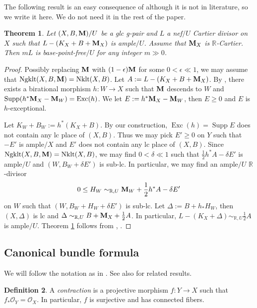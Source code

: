 \documentclass[11pt]{amsart}
\numberwithin{equation}{section}
\newcommand{\Mm}{{\bf{M}}}
\newcommand{\Rr}{\mathbb{R}}
\newcommand{\Exc}{\operatorname{Exc}}
\newcommand{\Nklt}{\operatorname{Nklt}}
\newcommand{\Supp}{\operatorname{Supp}}
\newcommand{\Ngklt}{\operatorname{Ngklt}}
\newtheorem{thm}{Theorem}[section]
\theoremstyle{definition}
\newtheorem{defn}[thm]{Definition}
\theoremstyle{definition}
\theoremstyle{definition}
\begin{document}
The following result is an easy consequence of \cite[Lemma
5.18]{HL21a} although it is not in literature, so we write it here.
We do not need it in the rest of the paper.

\begin{thm}\label{thm: bpf with mx r cartier}
  Let $(X,B,\Mm)/U$ be a glc g-pair and $L$ a nef$/U$ Cartier divisor
  on $X$ such that $L-(K_X+B+\Mm_X)$ is ample$/U$. Assume that
  $\Mm_X$ is $\mathbb R$-Cartier. Then $mL$ is base-point-free$/U$
  for any integer $m\gg 0$.
\end{thm}
\begin{proof}
  Possibly replacing $\Mm$ with $(1-\epsilon)\Mm$ for some
  $0<\epsilon\ll 1$, we may assume that $\Ngklt(X,B,\Mm)=\Nklt(X,B)$.
  Let $A:=L-(K_X+B+\Mm_X)$. By \cite[Lemma 5.18]{HL21a}, there exists
  a birational morphism $h: W\rightarrow X$ such that $\Mm$ descends
  to $W$ and $\Supp(h^*\Mm_X-\Mm_W)=\Exc(h)$. We let
  $E:=h^*\Mm_X-\Mm_W$, then $E\geq 0$ and $E$ is $h$-exceptional.

  Let $K_W+B_W:=h^*(K_X+B)$. By our construction, $\Exc(h)= \Supp E$
  does not contain any lc place of $(X,B)$. Thus we may pick $E'\geq
  0$ on $Y$ such that $-E'$ is ample$/X$ and $E'$ does not contain
  any lc place of $(X,B)$. Since $\Ngklt(X,B,\Mm)=\Nklt(X,B)$, we may
  find $0<\delta\ll 1$ such that $\frac{1}{2}h^*A-\delta E'$ is
  ample$/U$ and $(W,B_W+\delta E')$ is sub-lc. In particular, we may
  find an ample$/U$ $\Rr$-divisor $$0\leq
  H_W\sim_{\Rr,U}\Mm_W+\frac{1}{2}h^*A-\delta E'$$ on $W$ such that
  $(W,B_W+H_W+\delta E')$ is sub-lc. Let $\Delta:=B+h_*H_W$, then
  $(X,\Delta)$ is lc and $\Delta\sim_{\Rr,U}B+\Mm_X+\frac{1}{2}A$. In
  particular, $L-(K_X+\Delta)\sim_{\mathbb R,U}\frac{1}{2}A$ is
  ample$/U$. Theorem \ref{thm: bpf with mx r cartier} follows from
  \cite[Theorem 5.3]{Amb03}, \cite[Theorems 4.5.5, 6.5.1]{Fuj17}.
\end{proof}

\subsection{Canonical bundle formula}

We will follow the notation as in \cite{JLX22}. See also
\cite{Fil20,FS20,HL21b} for related results.

\begin{defn}\label{defn contraction}
  A \emph{contraction} is a projective morphism $f: Y\rightarrow X$
  such that $f_*\mathcal{O}_Y=\mathcal{O}_X$. In particular, $f$ is
  surjective and has connected fibers.
\end{defn}
\end{document}
